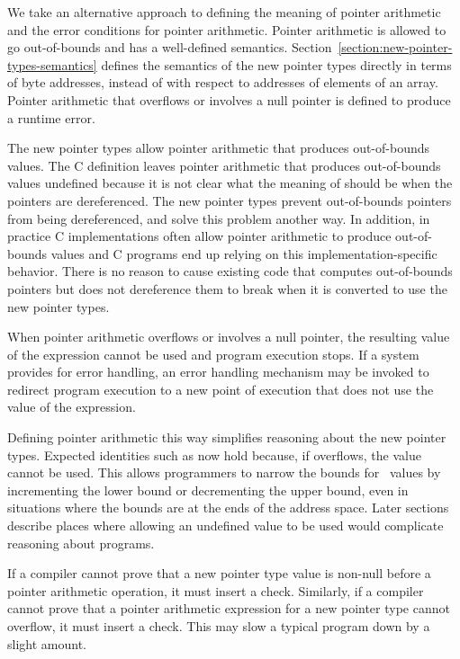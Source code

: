 We take an alternative approach to defining the meaning of pointer
arithmetic and the error conditions for pointer arithmetic. Pointer
arithmetic is allowed to go out-of-bounds and has a well-defined
semantics. Section~\ref{section:new-pointer-types-semantics}
defines the semantics of the new pointer types
directly in terms of byte addresses, instead of with respect to
addresses of elements of an array. Pointer arithmetic that overflows or
involves a null pointer is defined to produce a runtime error.

The new pointer types allow pointer arithmetic that produces
out-of-bounds values. The C definition leaves pointer arithmetic that
produces out-of-bounds values undefined because it is not clear what the
meaning of should be when the pointers are dereferenced. The new pointer
types prevent out-of-bounds pointers from being dereferenced, and solve
this problem another way. In addition, in practice C implementations
often allow pointer arithmetic to produce out-of-bounds values and C
programs end up relying on this implementation-specific behavior. There
is no reason to cause existing code that computes out-of-bounds pointers
but does not dereference them to break when it is converted to use the
new pointer types.

When pointer arithmetic overflows or involves a null pointer, the
resulting value of the expression cannot be used and program execution
stops. If a system provides for error handling, an error handling
mechanism may be invoked to redirect program execution to a new point of
execution that does not use the value of the expression.

Defining pointer arithmetic this way simplifies reasoning about the new
pointer types. Expected identities such as  now hold
because, if  overflows, the value cannot be
used. This allows programmers to narrow the bounds for
\arrayptr\ values by incrementing the lower bound or
decrementing the upper bound, even in situations where the bounds are at
the ends of the address space. Later sections describe places where
allowing an undefined value to be used would complicate reasoning about
programs.

If a compiler cannot prove that a new pointer type value is non-null
before a pointer arithmetic operation, it must insert a check.
Similarly, if a compiler cannot prove that a pointer arithmetic
expression for a new pointer type cannot overflow, it must insert a
check. This may slow a typical program down by a slight amount.

